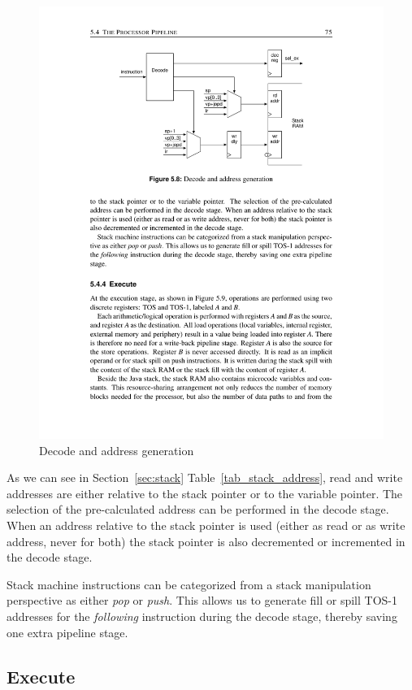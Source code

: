\begin{figure}
    \centering
    \includegraphics[scale=\picscale]{arch/arch_decaddr}
    \caption{Decode and address generation}
    \label{fig_arch_decode}
\end{figure}


As we can see in Section~\ref{sec:stack}
Table~\ref{tab_stack_address}, read and write addresses are either
relative to the stack pointer or to the variable pointer. The
selection of the pre-calculated address can be performed in the
decode stage. When an address relative to the stack pointer is used
(either as read or as write address, never for both) the stack
pointer is also decremented or incremented in the decode stage.

Stack machine instructions can be categorized from a stack
manipulation perspective as either \emph{pop} or \emph{push}. This
allows us to generate fill or spill TOS-1 addresses for the
\emph{following} instruction during the decode stage, thereby saving
one extra pipeline stage.

\subsection{Execute}


